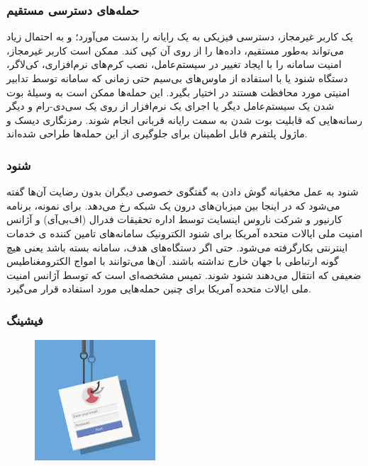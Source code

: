 \documentclass[12pt]{book}
\begin{document}

\subsubsection{
حمله‌های دسترسی مستقیم
}

یک کاربر غیرمجاز، دسترسی فیزیکی به یک رایانه را بدست می‌آورد؛ و به احتمال زیاد می‌تواند به‌طور مستقیم، داده‌ها را از روی آن کپی کند. ممکن است کاربر غیرمجاز، امنیت سامانه را با ایجاد تغییر در سیستم‌عامل، نصب کرم‌های نرم‌افزاری، کی‌لاگر، دستگاه شنود یا با استفاده از ماوس‌های بی‌سیم حتی زمانی که سامانه توسط تدابیر امنیتی مورد محافظت هستند در اختیار بگیرد. این حمله‌ها ممکن است به وسیلهٔ بوت شدن یک سیستم‌عامل دیگر یا اجرای یک نرم‌افزار از روی یک سی‌دی-رام و دیگر رسانه‌هایی که قابلیت بوت شدن به سمت رایانه قربانی انجام شوند. رمزنگاری دیسک و ماژول پلتفرم قابل اطمینان برای جلوگیری از این حمله‌ها طراحی شده‌اند. 

\subsubsection{
شنود
}

شنود به عمل مخفیانه گوش دادن به گفتگوی خصوصی دیگران بدون رضایت آن‌ها گفته می‌شود که در اینجا بین میزبان‌های درون یک شبکه رخ می‌دهد. برای نمونه، برنامه کارنیور و شرکت ناروس اینسایت توسط اداره تحقیقات فدرال (اف‌بی‌آی) و آژانس امنیت ملی ایالات متحده آمریکا برای شنود الکترونیک سامانه‌های تامین کننده ی خدمات اینترنتی بکارگرفته می‌شود. حتی اگر دستگاه‌های هدف، سامانه بسته باشد یعنی هیچ گونه ارتباطی با جهان خارج نداشته باشند. آن‌ها می‌توانند با امواج الکترومغناطیس ضعیفی که انتقال می‌دهند شنود شوند. تمپس 
مشخصه‌ای است که توسط آژانس امنیت ملی ایالات متحده آمریکا برای چنین حمله‌هایی مورد استفاده قرار می‌گیرد. 


\subsubsection{
فیشینگ
}


\begin{figure}
  \vspace{-20pt}
  \begin{center}
    \includegraphics[width=0.4\textwidth]{./Phishing-attack.jpg}
  \end{center}
  \vspace{-20pt}
  \caption{}
  \vspace{-10pt}
\end{figure}
\end{document}
